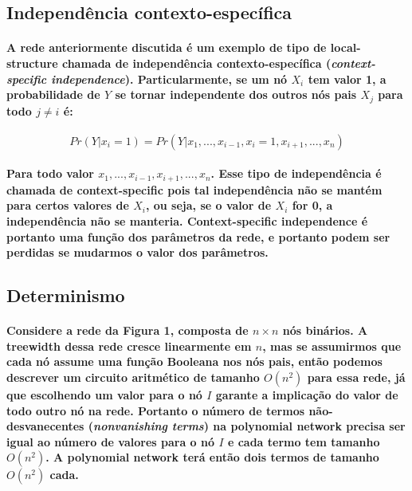\documentclass[a4paper,10pt]{article}
\theoremstyle{plain}
\begin{document}
\subsection{Independência contexto-específica}

\paragraph{
  A rede anteriormente discutida é um exemplo de tipo de local-structure chamada de independência
  contexto-específica (\textit{context-specific independence}). Particularmente, se um nó $X_i$ tem
  valor 1, a probabilidade de $Y$ se tornar independente dos outros nós pais $X_j$ para todo
  $j \neq i$ é:
}

\begin{equation}
  Pr(Y|x_i=1) = Pr(Y|x_1,...,x_{i-1},x_i=1,x_{i+1},...,x_n)
\end{equation}

\paragraph{
  Para todo valor $x_1,...,x_{i-1},x_{i+1},...,x_n$. Esse tipo de independência é chamada de
  context-specific pois tal independência não se mantém para certos valores de $X_i$, ou seja, se
  o valor de $X_i$ for 0, a independência não se manteria. Context-specific independence é portanto
  uma função dos parâmetros da rede, e portanto podem ser perdidas se mudarmos o valor dos
  parâmetros.
}

\subsection{Determinismo}

\paragraph{
  Considere a rede da Figura 1, composta de $n \times n$ nós binários. A treewidth dessa rede
  cresce linearmente em $n$, mas se assumirmos que cada nó assume uma função Booleana nos nós pais,
  então podemos descrever um circuito aritmético de tamanho $O(n^2)$ para essa rede, já que
  escolhendo um valor para o nó $I$ garante a implicação do valor de todo outro nó na rede.
  Portanto o número de termos não-desvanecentes (\textit{nonvanishing terms}) na polynomial network
  precisa ser igual ao número de valores para o nó $I$ e cada termo tem tamanho $O(n^2)$. A
  polynomial network terá então dois termos de tamanho $O(n^2)$ cada.
}
\end{document}
